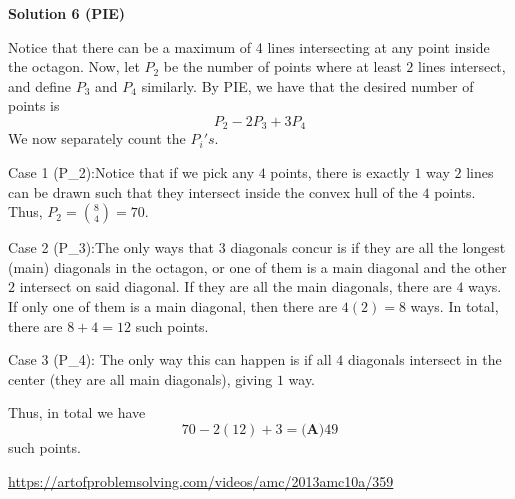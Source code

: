 \begin{enumerate}
\textbf{Solution 6 (PIE)}

Notice that there can be a maximum of 4 lines intersecting at any point inside the octagon. Now, let $P_2$ be the number of points where at least $2$ lines intersect, and define $P_3$ and $P_4$ similarly. By PIE, we have that the desired number of points is
 \[P_2 - 2P_3 + 3P_4\]We now separately count the $P_i's$. 

 
Case 1 (P\_2):Notice that if we pick any $4$ points, there is exactly $1$ way $2$ lines can be drawn such that they intersect inside the convex hull of the $4$ points. Thus, $P_2 = {8 \choose 4} = 70$.

 
Case 2 (P\_3):The only ways that $3$ diagonals concur is if they are all the longest (main) diagonals in the octagon, or one of them is a main diagonal and the other $2$ intersect on said diagonal. If they are all the main diagonals, there are $4$ ways. If only one of them is a main diagonal, then there are $4(2) = 8$ ways. In total, there are $8 + 4 = 12$ such points.

 
Case 3 (P\_4): The only way this can happen is if all $4$ diagonals intersect in the center (they are all main diagonals), giving $1$ way.

 
Thus, in total we have
 \[70 - 2(12) + 3 = \boxed{\textbf{(A)} 49}\]such points.

 \href{https://artofproblemsolving.com/videos/amc/2013amc10a/359}{https://artofproblemsolving.com/videos/amc/2013amc10a/359}

 


\end{enumerate}